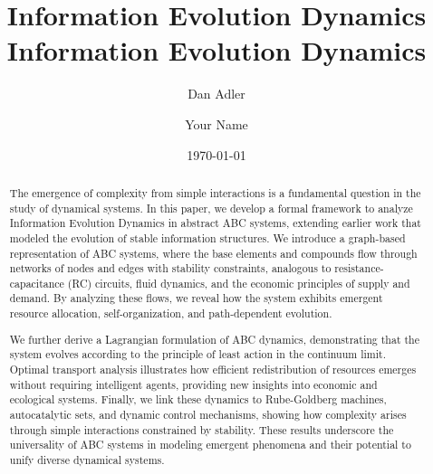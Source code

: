 \documentclass[%
 preprint, linenumbers,
 amsmath,amssymb,
 aps, physrev,
]{revtex4-2}
\begin{document}

\title{\textbf{Information Evolution Dynamics} 
}%


\author{Dan Adler}
\date{\today}%

\begin{abstract}
The emergence of complexity from simple interactions is a fundamental question in the study of dynamical systems. In this paper, we develop a formal framework to analyze Information Evolution Dynamics in abstract ABC systems, extending earlier work that modeled the evolution of stable information structures. We introduce a graph-based representation of ABC systems, where the base elements and compounds flow through networks of nodes and edges with stability constraints, analogous to resistance-capacitance (RC) circuits, fluid dynamics, and the economic principles of supply and demand. By analyzing these flows, we reveal how the system exhibits emergent resource allocation, self-organization, and path-dependent evolution.

We further derive a Lagrangian formulation of ABC dynamics, demonstrating that the system evolves according to the principle of least action in the continuum limit. Optimal transport analysis illustrates how efficient redistribution of resources emerges without requiring intelligent agents, providing new insights into economic and ecological systems. Finally, we link these dynamics to Rube-Goldberg machines, autocatalytic sets, and dynamic control mechanisms, showing how complexity arises through simple interactions constrained by stability. These results underscore the universality of ABC systems in modeling emergent phenomena and their potential to unify diverse dynamical systems.
\end{abstract}

\maketitle


\title{Information Evolution Dynamics}

\author{Your Name}

\maketitle
\end{document}
